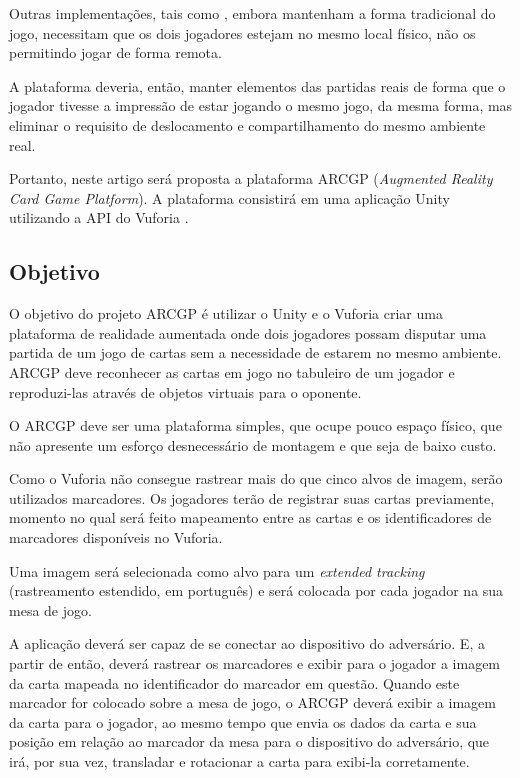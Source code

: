 \documentclass[conference]{IEEEtran}
\begin{document}
Outras implementações, tais como \cite{joao}, embora mantenham a forma 
tradicional do jogo, necessitam que os dois jogadores estejam no mesmo local 
físico, não os permitindo jogar de forma remota.

A plataforma deveria, então, manter elementos das partidas reais de forma 
que o jogador tivesse a impressão de estar jogando o mesmo jogo, da mesma forma, 
mas eliminar o requisito de deslocamento e compartilhamento do mesmo ambiente 
real.

Portanto, neste artigo será proposta a plataforma ARCGP (\textit{Augmented 
Reality Card Game Platform}). A plataforma consistirá em uma aplicação 
Unity \cite{unity} utilizando a API do Vuforia \cite{vuforia}. 

\subsection{Objetivo}
\label{objetivo}
O objetivo do projeto ARCGP é utilizar o Unity e o Vuforia criar uma plataforma 
de realidade aumentada onde dois jogadores possam disputar uma partida de um 
jogo de cartas sem a necessidade de estarem no mesmo ambiente. ARCGP deve 
reconhecer as cartas em jogo no tabuleiro de um jogador e reproduzi-las através 
de objetos virtuais para o oponente.

O ARCGP deve ser uma plataforma simples, que ocupe pouco espaço físico, que não 
apresente um esforço desnecessário de montagem e que seja de baixo custo.

Como o Vuforia não consegue rastrear mais do que cinco alvos de imagem, serão 
utilizados marcadores. Os jogadores terão de registrar suas cartas previamente, 
momento no qual será feito mapeamento entre as cartas e os identificadores de 
marcadores disponíveis no Vuforia.

Uma imagem será selecionada como alvo para um \textit{extended tracking} 
(rastreamento estendido, em português) e será colocada por cada jogador na sua 
mesa de jogo.

A aplicação deverá ser capaz de se conectar ao dispositivo do adversário. E, a 
partir de então, deverá rastrear os marcadores e exibir para o jogador a imagem 
da carta mapeada no identificador do marcador em questão. Quando este marcador 
for colocado sobre a mesa de jogo, o ARCGP deverá exibir a imagem da carta para 
o jogador, ao mesmo tempo que envia os dados da carta e sua posição em relação 
ao marcador da mesa para o dispositivo do adversário, que irá, por sua vez, 
transladar e rotacionar a carta para exibi-la corretamente.
\end{document}

